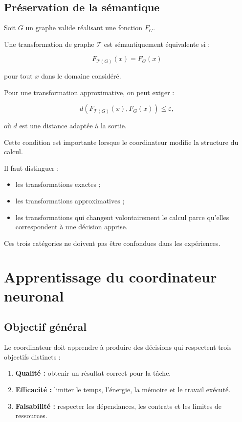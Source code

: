 \documentclass[11pt,a4paper]{article}
\begin{document}
\subsection{Préservation de la sémantique}

Soit $G$ un graphe valide réalisant une fonction $F_G$.

Une transformation de graphe $\mathcal{T}$ est sémantiquement
équivalente si :

\[
F_{\mathcal{T}(G)}(x)
=
F_G(x)
\]

pour tout $x$ dans le domaine considéré.

Pour une transformation approximative, on peut exiger :

\[
d\left(
F_{\mathcal{T}(G)}(x),
F_G(x)
\right)
\leq \varepsilon,
\]

où $d$ est une distance adaptée à la sortie.

Cette condition est importante lorsque le coordinateur modifie
la structure du calcul.

Il faut distinguer :
\begin{itemize}
  \item les transformations exactes ;
  \item les transformations approximatives ;
  \item les transformations qui changent volontairement le calcul
        parce qu'elles correspondent à une décision apprise.
\end{itemize}

Ces trois catégories ne doivent pas être confondues dans les
expériences.

\section{Apprentissage du coordinateur neuronal}

\subsection{Objectif général}

Le coordinateur doit apprendre à produire des décisions qui
respectent trois objectifs distincts :

\begin{enumerate}
  \item \textbf{Qualité :} obtenir un résultat correct pour la tâche.
  \item \textbf{Efficacité :} limiter le temps, l'énergie, la mémoire
        et le travail exécuté.
  \item \textbf{Faisabilité :} respecter les dépendances, les contrats
        et les limites de ressources.
\end{enumerate}
\end{document}
